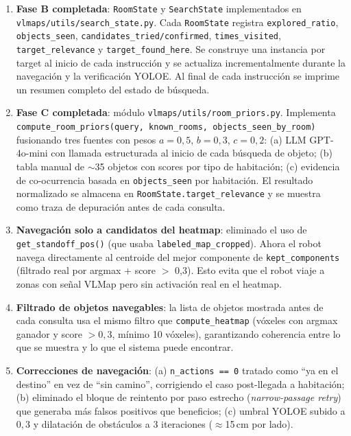 \documentclass[11pt,a4paper]{article}
\begin{document}
\begin{enumerate}
  \item \textbf{Fase B completada}: \texttt{RoomState} y \texttt{SearchState}
        implementados en \texttt{vlmaps/utils/search\_state.py}. Cada
        \texttt{RoomState} registra \texttt{explored\_ratio}, \texttt{objects\_seen},
        \texttt{candidates\_tried/confirmed}, \texttt{times\_visited},
        \texttt{target\_relevance} y \texttt{target\_found\_here}. Se construye una
        instancia por target al inicio de cada instrucción y se actualiza
        incrementalmente durante la navegación y la verificación YOLOE. Al final de
        cada instrucción se imprime un resumen completo del estado de búsqueda.

  \item \textbf{Fase C completada}: módulo \texttt{vlmaps/utils/room\_priors.py}.
        Implementa \texttt{compute\_room\_priors(query, known\_rooms,
        objects\_seen\_by\_room)} fusionando tres fuentes con pesos
        $a=0{,}5$, $b=0{,}3$, $c=0{,}2$: (a) LLM GPT-4o-mini con llamada
        estructurada al inicio de cada búsqueda de objeto; (b) tabla manual de
        $\sim$35 objetos con scores por tipo de habitación; (c) evidencia de
        co-ocurrencia basada en \texttt{objects\_seen} por habitación. El resultado
        normalizado se almacena en \texttt{RoomState.target\_relevance} y se
        muestra como traza de depuración antes de cada consulta.

  \item \textbf{Navegación solo a candidatos del heatmap}: eliminado el uso de
        \texttt{get\_standoff\_pos()} (que usaba \texttt{labeled\_map\_cropped}).
        Ahora el robot navega directamente al centroide del mejor componente de
        \texttt{kept\_components} (filtrado real por argmax + score $>$ 0{,}3).
        Esto evita que el robot viaje a zonas con señal VLMap pero sin activación
        real en el heatmap.

  \item \textbf{Filtrado de objetos navegables}: la lista de objetos mostrada antes
        de cada consulta usa el mismo filtro que \texttt{compute\_heatmap} (vóxeles
        con argmax ganador y score $> 0{,}3$, mínimo 10 vóxeles), garantizando
        coherencia entre lo que se muestra y lo que el sistema puede encontrar.

  \item \textbf{Correcciones de navegación}: (a) \texttt{n\_actions == 0} tratado
        como ``ya en el destino'' en vez de ``sin camino'', corrigiendo el caso
        post-llegada a habitación; (b) eliminado el bloque de reintento por paso
        estrecho (\textit{narrow-passage retry}) que generaba más falsos positivos
        que beneficios; (c) umbral YOLOE subido a $0{,}3$ y dilatación de obstáculos
        a 3 iteraciones ($\approx$15\,cm por lado).


\end{enumerate}
\end{document}
